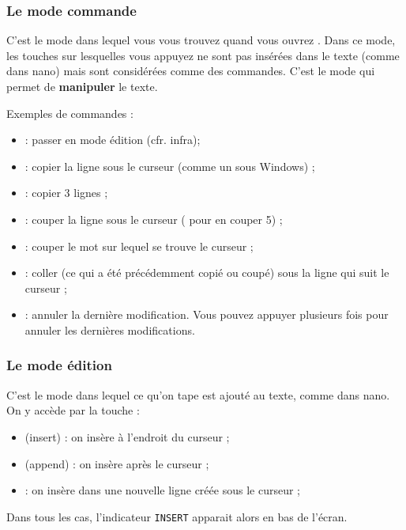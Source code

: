\documentclass[a4paper,11pt]{style-esi/td}
\begin{document}
		\subsubsection*{Le mode commande}

			C'est le mode dans lequel vous vous trouvez quand vous ouvrez . 
			Dans ce mode, les touches sur lesquelles vous appuyez
			ne sont pas insérées dans le texte (comme dans nano)
			mais sont considérées comme des commandes.
			C'est le mode qui permet de \textbf{manipuler} le texte.

			Exemples de commandes :
			\begin{itemize}
			\item {} : passer en mode édition (cfr. infra);
			\item {} : copier la ligne sous le curseur (comme un  sous Windows) ; 
			\item {}	: copier 3 lignes ;
			\item {} : couper la ligne sous le curseur ( pour en couper 5) ;
			\item {} : couper le mot sur lequel se trouve le curseur ;
			\item {} : coller (ce qui a été précédemment copié ou coupé)
				sous la ligne qui suit le curseur ;
			\item {} : annuler la dernière modification. 
				Vous pouvez appuyer plusieurs fois pour annuler les dernières modifications.	
			\end{itemize}

			\subsubsection*{Le mode édition}
		
				C'est le mode dans lequel ce qu'on tape est ajouté au texte,
				comme dans nano.
				On y accède par la touche :
				\begin{itemize}
				\item {} (insert) : on insère à l'endroit du curseur ;
				\item {} (append) : on insère après le curseur ;
				\item {} : on insère dans une nouvelle ligne créée sous le curseur ;
				\end{itemize}

				Dans tous les cas, l'indicateur \texttt{INSERT} 
				apparait alors en bas de l'écran.
\end{document}
